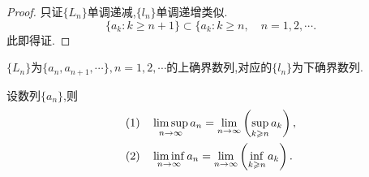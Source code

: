 \begin{proof}
    只证$\{L_n\}$单调递减,$\{l_n\}$单调递增类似.
    \[\{a_k:k\geqslant n+1\}\subset\{a_k:k\geqslant n,\quad n=1,2,\cdots.\]
    此即得证.
\end{proof}

\begin{note}
    $\{L_n\}$为$\{a_n,a_{n+1},\cdots\},n=1,2,\cdots$的上确界数列,对应的$\{l_n\}$为下确界数列.
\end{note}

\begin{theorem}
    \label{sxjxdy3}
    设数列$\{a_n\}$,则
    \begin{align*}
        &(1)\quad\limsup_{n\to\infty}a_n=\lim_{n\to\infty}\left(\sup_{k\geqslant n}a_k\right),\\
        &(2)\quad\liminf_{n\to\infty}a_n=\lim_{n\to\infty}\left(\inf_{k\geqslant n}a_k\right).
    \end{align*}
\end{theorem}


